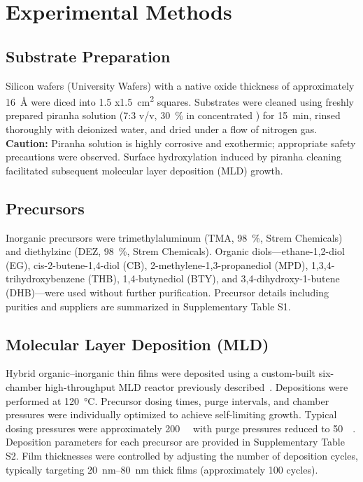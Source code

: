 \section{Experimental Methods}

\subsection{Substrate Preparation}

Silicon wafers (University Wafers) with a native oxide thickness of approximately \SI{16}{\angstrom} were diced into 1.5 x\SI{1.5}{\centi\meter\squared} squares. Substrates were cleaned using freshly prepared piranha solution (7:3 v/v, \SI{30}{\percent}  in concentrated ) for \SI{15}{\minute}, rinsed thoroughly with deionized water, and dried under a flow of nitrogen gas. \textbf{Caution:} Piranha solution is highly corrosive and exothermic; appropriate safety precautions were observed. Surface hydroxylation induced by piranha cleaning facilitated subsequent molecular layer deposition (MLD) growth.

\subsection{Precursors}

Inorganic precursors were trimethylaluminum (TMA, \SI{98}{\percent}, Strem Chemicals) and diethylzinc (DEZ, \SI{98}{\percent}, Strem Chemicals). Organic diols—ethane-1,2-diol (EG), cis-2-butene-1,4-diol (CB), 2-methylene-1,3-propanediol (MPD), 1,3,4-trihydroxybenzene (THB), 1,4-butynediol (BTY), and 3,4-dihydroxy-1-butene (DHB)—were used without further purification. Precursor details including purities and suppliers are summarized in Supplementary Table S1.

\subsection{Molecular Layer Deposition (MLD)}

Hybrid organic–inorganic thin films were deposited using a custom-built six-chamber high-throughput MLD reactor previously described~\cite{Choe2024}. Depositions were performed at \SI{120}{\celsius}. Precursor dosing times, purge intervals, and chamber pressures were individually optimized to achieve self-limiting growth. Typical dosing pressures were approximately \SI{200}{\milli\torr} with purge pressures reduced to \SI{50}{\milli\torr}. Deposition parameters for each precursor are provided in Supplementary Table S2. Film thicknesses were controlled by adjusting the number of deposition cycles, typically targeting \SIrange{20}{80}{\nano\meter} thick films (approximately 100 cycles).

